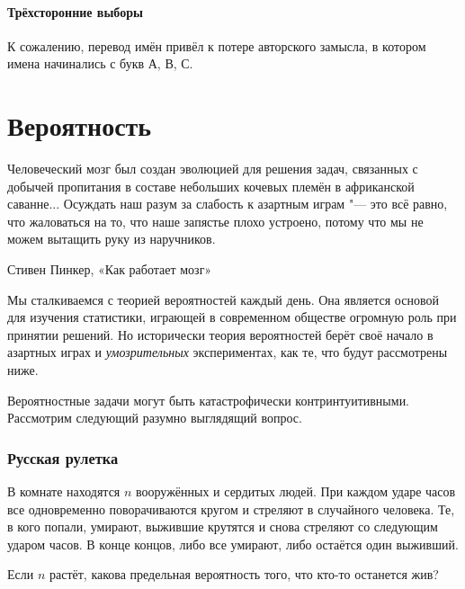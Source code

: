 \documentclass[twoside]{book}
\makeatletter
\newcommand{\rindex}[2][\imki@jobname]{%
  \index[#1]{\detokenize{#2}}%
}
\makeatother
\begin{document}
\subsubsection{Трёхсторонние выборы}
К сожалению, перевод имён привёл к потере авторского замысла, в котором имена начинались с букв А, В, С.



\chapter{Вероятность}

\setlength{\epigraphwidth}{.8\textwidth}
\epigraph{Человеческий мозг был создан эволюцией для решения задач, связанных с добычей пропитания в составе небольших кочевых племён в африканской саванне...
  Осуждать наш разум за слабость к азартным играм "--- это всё равно, что жаловаться на то, что наше запястье плохо устроено, потому что мы не можем вытащить руку из наручников.%
}{Стивен Пинкер, «Как работает мозг»%
}

Мы сталкиваемся с теорией вероятностей каждый день.
Она является основой для изучения статистики, играющей в современном обществе огромную роль при принятии решений.
Но исторически теория вероятностей берёт своё начало в азартных играх и \emph{умозрительных} экспериментах, как те, что будут рассмотрены ниже.

\medskip

Вероятностные задачи могут быть катастрофически контринтуитивными.
Рассмотрим следующий разумно выглядящий вопрос.

\subsection*{Русская рулетка} %
\rindex{Русская рулетка}

В комнате находятся $n$ вооружённых и сердитых людей.
При каждом ударе часов все одновременно поворачиваются кругом и стреляют в случайного человека.
Те, в кого попали, умирают, выжившие крутятся и снова стреляют со следующим ударом часов.
В конце концов, либо все умирают, либо остаётся один выживший.

Если $n$ растёт, какова предельная вероятность того, что кто-то останется жив?
\end{document}
